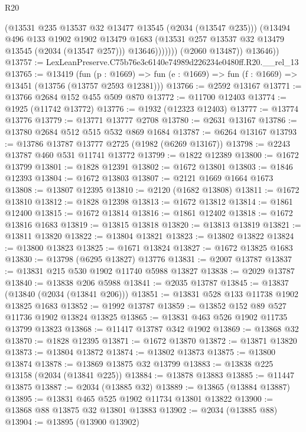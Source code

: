 \begin{lexlean}{R20}
\begin{coremodule}
                      (@13531 @235 @13537 @32 @13477 @13545 (@2034 (@13547 @235)))
                      (@13494
                        @496
                        @133
                        @1902
                        @1902
                        @13479
                        @1683
                        (@13531 @257 @13537 @32 @13479 @13545 (@2034 (@13547 @257)))
                        @13646)))))))
          (@2060 @13487))
        @13646))
@13757 := LexLeanPreserve.C75b76e3c6140e74989d226234e0480ff.R20.__rel_13
@13765 := @13419
    (fun (p : @1669) => fun (e : @1669) => fun (f : @1669) => @13451 (@13756 (@13757 @2593 @12381)))
@13766 := @2592 @13167
@13771 := @13766 @2684 @152 @455 @509 @870
@13772 := @11700 @12403
@13774 := @1925 (@11742 @13772)
@13776 := @1932 (@12323 @12403)
@13777 := @13774 @13776
@13779 := @13771 @13777 @2708
@13780 := @2631 @13167
@13786 := @13780 @2684 @512 @515 @532 @869 @1684
@13787 := @6264 @13167
@13793 := @13786 @13787 @13777 @2725 (@1982 (@6269 @13167))
@13798 := @2243 @13787 @460 @531 @11741 @13772
@13799 := @1822 @12389
@13800 := @1672 @13799
@13801 := @1828 @12391
@13802 := @1672 @13801
@13803 := @1846 @12393
@13804 := @1672 @13803
@13807 := @2121 @1669 @1664 @1673
@13808 := @13807 @12395
@13810 := @2120 (@1682 @13808)
@13811 := @1672 @13810
@13812 := @1828 @12398
@13813 := @1672 @13812
@13814 := @1861 @12400
@13815 := @1672 @13814
@13816 := @1861 @12402
@13818 := @1672 @13816 @1683
@13819 := @13815 @13818
@13820 := @13813 @13819
@13821 := @13811 @13820
@13822 := @13804 @13821
@13823 := @13802 @13822
@13824 := @13800 @13823
@13825 := @1671 @13824
@13827 := @1672 @13825 @1683
@13830 := @13798 (@6295 @13827) @13776
@13831 := @2007 @13787
@13837 := @13831 @215 @530 @1902 @11740 @5988 @13827
@13838 := @2029 @13787
@13840 := @13838 @206 @5988
@13841 := @2035 @13787
@13845 := @13837 (@13840 (@2034 (@13841 @206)))
@13851 := @13831 @528 @133 @11738 @1902 @13825 @1683
@13852 := @1992 @13787
@13859 := @13852 @152 @89 @527 @11736 @1902 @13824 @13825
@13865 := @13831 @463 @526 @1902 @11735 @13799 @13823
@13868 := @11417 @13787 @342 @1902
@13869 := @13868 @32
@13870 := @1828 @12395
@13871 := @1672 @13870
@13872 := @13871 @13820
@13873 := @13804 @13872
@13874 := @13802 @13873
@13875 := @13800 @13874
@13878 := @13869 @13875 @32 @13799
@13883 := @13838 @225 @13158 (@2034 (@13841 @225))
@13884 := @13878 @13883
@13885 := @11447 @13875
@13887 := @2034 (@13885 @32)
@13889 := @13865 (@13884 @13887)
@13895 := @13831 @465 @525 @1902 @11734 @13801 @13822
@13900 := @13868 @88 @13875 @32 @13801 @13883
@13902 := @2034 (@13885 @88)
@13904 := @13895 (@13900 @13902)

\end{coremodule}
\end{lexlean}
